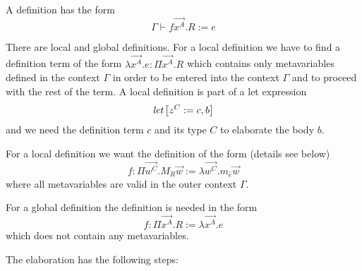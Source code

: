 A definition has the form
$$
    \Gamma \vdash f \vec {x^A}. R := e
$$

There are local and global definitions. For a local definition we have to find a
definition term of the form $\lambda \vec {x^A}. e: \Pi \vec{x^A}. R$ which
contains only metavariables defined in the context $\Gamma$ in order to be
entered into the context $\Gamma$ and to proceed with the rest of the term.
A local definition is part of a let expression
$$
    {{\text{\it let}} \left[ {z^C := c, b} \right]}
$$
and we need the definition term $c$ and its type $C$ to elaborate the body $b$.

For a local definition we want the definition of the form (details see below)
$$
    f
    :
    \Pi \vec {w^C}. M_R \vec w
    :=
    \lambda \vec{w^C}. m_{\hat e} \vec w
$$
where all metavariables are valid in the outer context $\Gamma$.

For a global definition the definition is needed in the form
$$
    f: \Pi \vec{x^A} . R := \lambda \vec {x^A}. e
$$
which does not contain any metavariables.



The elaboration has the following steps:

